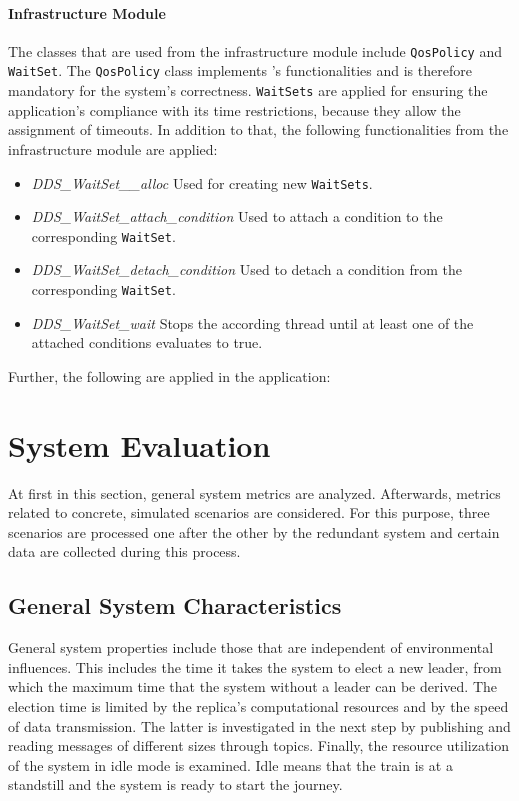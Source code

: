 \paragraph{Infrastructure Module}
The classes that are used from the infrastructure module include \texttt{QosPolicy} and \texttt{WaitSet}.
The \texttt{QosPolicy} class implements 's  functionalities and is therefore mandatory for the system's correctness.
\texttt{WaitSets} are applied for ensuring the application's compliance with its time restrictions, because they allow the assignment of timeouts.
In addition to that, the following functionalities from the infrastructure module are applied:

\begin{itemize}
\item \textit{DDS\_WaitSet\_\_alloc} Used for creating new \texttt{WaitSets}.
\item \textit{DDS\_WaitSet\_attach\_condition} Used to attach a condition to the corresponding \texttt{WaitSet}.
\item \textit{DDS\_WaitSet\_detach\_condition} Used to detach a condition from the corresponding \texttt{WaitSet}.
\item \textit{DDS\_WaitSet\_wait} Stops the according thread until at least one of the attached conditions evaluates to true.
\end{itemize}

Further, the following  are applied in the application:


\section{System Evaluation}
At first in this section, general system metrics are analyzed.
Afterwards, metrics related to concrete, simulated scenarios are considered.
For this purpose, three scenarios are processed one after the other by the redundant system and certain data are collected during this process.

\subsection{General System Characteristics}
General system properties include those that are independent of environmental influences.
This includes the time it takes the system to elect a new leader, from which the maximum time that the system without a leader can be derived.
The election time is limited by the replica's computational resources and by the speed of data transmission.
The latter is investigated in the next step by publishing and reading messages of different sizes through  topics.
Finally, the resource utilization of the system in idle mode is examined.
Idle means that the train is at a standstill and the system is ready to start the journey.

